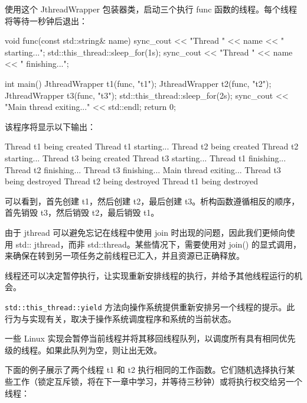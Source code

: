 使用这个 JthreadWrapper 包装器类，启动三个执行 func 函数的线程。每个线程将等待一秒钟后退出：

\begin{cpp}
void func(const std::string& name) {
    sync_cout << "Thread " << name << " starting...\n";
    std::this_thread::sleep_for(1s);
    sync_cout << "Thread " << name << " finishing...\n";
}

int main() {
    JthreadWrapper t1(func, "t1");
    JthreadWrapper t2(func, "t2");
    JthreadWrapper t3(func, "t3");
    std::this_thread::sleep_for(2s);
    sync_cout << "Main thread exiting..." << std::endl;
    return 0;
}
\end{cpp}

该程序将显示以下输出：

\begin{shell}
Thread t1 being created
Thread t1 starting...
Thread t2 being created
Thread t2 starting...
Thread t3 being created
Thread t3 starting...
Thread t1 finishing...
Thread t2 finishing...
Thread t3 finishing...
Main thread exiting...
Thread t3 being destroyed
Thread t2 being destroyed
Thread t1 being destroyed
\end{shell}

可以看到，首先创建 t1，然后创建 t2，最后创建 t3。析构函数遵循相反的顺序，首先销毁 t3，然后销毁 t2，最后销毁 t1。

由于 jthread 可以避免忘记在线程中使用 join 时出现的问题，因此我们更倾向使用 std:: jthread，而非 std::thread。某些情况下，需要使用对 join() 的显式调用，来确保在转到另一项任务之前线程已汇入，并且资源已正确释放。


线程还可以决定暂停执行，让实现重新安排线程的执行，并给予其他线程运行的机会。

\verb|std::this_thread::yield| 方法向操作系统提供重新安排另一个线程的提示。此行为与实现有关，取决于操作系统调度程序和系统的当前状态。

一些 Linux 实现会暂停当前线程并将其移回线程队列，以调度所有具有相同优先级的线程。如果此队列为空，则让出无效。

下面的例子展示了两个线程 t1 和 t2 执行相同的工作函数。它们随机选择执行某些工作（锁定互斥锁，将在下一章中学习，并等待三秒钟）或将执行权交给另一个线程：

